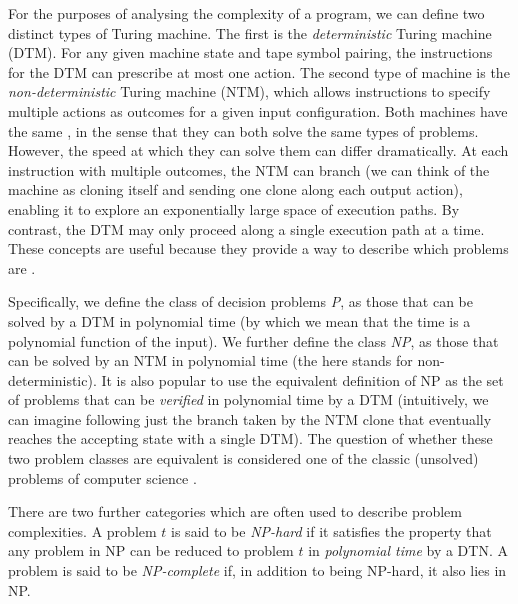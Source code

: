 For the purposes of analysing the complexity of a program, we can define two distinct types of Turing machine. The first is the \textit{deterministic} Turing machine (DTM).  For any given machine state and tape symbol pairing, the instructions for the DTM can prescribe at most one action. The second type of machine is the \textit{non-deterministic} Turing machine (NTM), which allows instructions to specify multiple actions as outcomes for a given input configuration.  Both machines have the same , in the sense that they can both solve the same types of problems.  However, the speed at which they can solve them can differ dramatically.  At each instruction with multiple outcomes, the NTM can branch (we can think of the machine as cloning itself and sending one clone along each output action), enabling it to explore an exponentially large space of execution paths.  By contrast, the DTM may only proceed along a single execution path at a time.  These concepts are useful because they provide a way to describe which problems are .

Specifically, we define the class of decision problems \textit{P}, as those that can be solved by a DTM in polynomial time (by which we mean that the time is a polynomial function of the input).  We further define the class \textit{NP}, as those that can be solved by an NTM in polynomial time (the  here stands for non-deterministic). It is also popular to use the equivalent definition of NP as the set of problems that can be \textit{verified} in polynomial time by a DTM (intuitively, we can imagine following just the branch taken by the NTM clone that eventually reaches the accepting state with a single DTM).  The question of whether these two problem classes are equivalent is considered one of the classic (unsolved) problems of computer science \cite{pvnp}.

There are two further categories which are often used to describe problem complexities. A problem $t$ is said to be \textit{NP-hard} if it satisfies the property that any problem in NP can be reduced to problem $t$ in \textit{polynomial time} by a DTN.  A problem is said to be \textit{NP-complete} if, in addition to being NP-hard, it also lies in NP.  